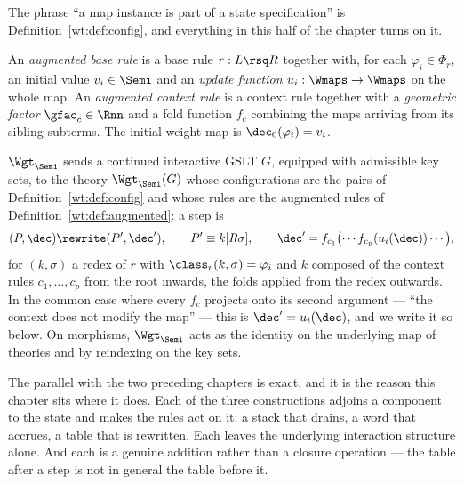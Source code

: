 The phrase ``a map instance is part of a state specification'' is
Definition~\ref{wt:def:config}, and everything in this half of the chapter turns on it.

\begin{definition}
\label{wt:def:augmented}
An \emph{augmented base rule} is a base rule $r : L \rsq R$ together with, for each
$\varphi_i \in \Phi_r$, an initial value $v_i \in \Semi$ and an \emph{update function}
$u_i : \Wmaps \to \Wmaps$ on the whole map. An \emph{augmented context rule} is a context
rule together with a \emph{geometric factor} $\gfac_c \in \Rnn$ and a fold function
$f_c$ combining the maps arriving from its sibling subterms. The initial weight map is
$\dec_0(\varphi_i) = v_i$.
\end{definition}

\begin{construction}
\label{wt:con:functor}
$\Wgt_{\Semi}$ sends a continued interactive GSLT $G$, equipped with admissible key sets,
to the theory $\Wgt_{\Semi}(G)$ whose configurations are the pairs of
Definition~\ref{wt:def:config} and whose rules are the augmented rules of
Definition~\ref{wt:def:augmented}: a step is
\[
  (P, \dec) \rewrite (P', \dec'),
  \qquad
  P' \equiv k[R\sigma],
  \qquad
  \dec' = f_{c_1}\bigl(\cdots f_{c_p}(u_i(\dec))\cdots\bigr),
\]
for $(k,\sigma)$ a redex of $r$ with $\class_r(k,\sigma) = \varphi_i$ and $k$ composed of
the context rules $c_1, \ldots, c_p$ from the root inwards, the folds applied from the
redex outwards. In the common case where every $f_c$ projects onto its second argument ---
``the context does not modify the map'' --- this is $\dec' = u_i(\dec)$, and we write it so
below. On morphisms, $\Wgt_{\Semi}$ acts as the identity on the underlying map of theories
and by reindexing on the key sets.
\end{construction}

The parallel with the two preceding chapters is exact, and it is the reason this chapter
sits where it does. Each of the three constructions adjoins a component to the state and
makes the rules act on it: a stack that drains, a word that accrues, a table that is
rewritten. Each leaves the underlying interaction structure alone. And each is a genuine
addition rather than a closure operation --- the table after a step is not in general the
table before it.

